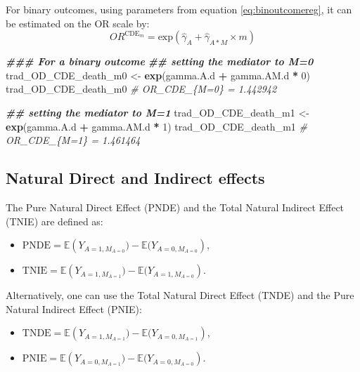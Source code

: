 \documentclass[
]{book}
\newenvironment{Shaded}{\begin{snugshade}}{\end{snugshade}}
\newcommand{\CommentTok}[1]{\textcolor[rgb]{0.56,0.35,0.01}{\textit{#1}}}
\newcommand{\DecValTok}[1]{\textcolor[rgb]{0.00,0.00,0.81}{#1}}
\newcommand{\DocumentationTok}[1]{\textcolor[rgb]{0.56,0.35,0.01}{\textbf{\textit{#1}}}}
\newcommand{\FunctionTok}[1]{\textcolor[rgb]{0.13,0.29,0.53}{\textbf{#1}}}
\newcommand{\NormalTok}[1]{#1}
\newcommand{\OtherTok}[1]{\textcolor[rgb]{0.56,0.35,0.01}{#1}}
\newcommand{\SpecialCharTok}[1]{\textcolor[rgb]{0.81,0.36,0.00}{\textbf{#1}}}
\providecommand{\tightlist}{%
  \setlength{\itemsep}{0pt}\setlength{\parskip}{0pt}}
\begin{document}
For binary outcomes, using parameters from equation \eqref{eq:binoutcomereg}, it can be estimated on the OR scale by:
\[OR^{\text{CDE}_m} = \text{exp}\left(\hat{\gamma}_A + \hat{\gamma}_{A \ast M} \times m\right)\]

\begin{Shaded}
\begin{Highlighting}[]
\DocumentationTok{\#\#\# For a binary outcome}
\DocumentationTok{\#\# setting the mediator to M=0}
\NormalTok{trad\_OD\_CDE\_death\_m0 }\OtherTok{\textless{}{-}} \FunctionTok{exp}\NormalTok{(gamma.A.d }\SpecialCharTok{+}\NormalTok{ gamma.AM.d }\SpecialCharTok{*} \DecValTok{0}\NormalTok{)}
\NormalTok{trad\_OD\_CDE\_death\_m0}
\CommentTok{\# OR\_CDE\_\{M=0\} = 1.442942 }

\DocumentationTok{\#\# setting the mediator to M=1}
\NormalTok{trad\_OD\_CDE\_death\_m1 }\OtherTok{\textless{}{-}} \FunctionTok{exp}\NormalTok{(gamma.A.d }\SpecialCharTok{+}\NormalTok{ gamma.AM.d }\SpecialCharTok{*} \DecValTok{1}\NormalTok{)}
\NormalTok{trad\_OD\_CDE\_death\_m1}
\CommentTok{\# OR\_CDE\_\{M=1\} = 1.461464 }
\end{Highlighting}
\end{Shaded}

\hypertarget{trad2waynatural}{%
\subsection{Natural Direct and Indirect effects}\label{trad2waynatural}}

The Pure Natural Direct Effect (PNDE) and the Total Natural Indirect Effect (TNIE) are defined as:

\begin{itemize}
\tightlist
\item
  \(\text{PNDE} = \mathbb{E}\left(Y_{A=1,M_{A=0}}) - \mathbb{E}(Y_{A=0,M_{A=0}}\right)\),
\item
  \(\text{TNIE} = \mathbb{E}\left(Y_{A=1,M_{A=1}}) - \mathbb{E}(Y_{A=1,M_{A=0}}\right)\).
\end{itemize}

Alternatively, one can use the Total Natural Direct Effect (TNDE) and the Pure Natural Indirect Effect (PNIE):

\begin{itemize}
\tightlist
\item
  \(\text{TNDE} = \mathbb{E}\left(Y_{A=1,M_{A=1}}) - \mathbb{E}(Y_{A=0,M_{A=1}}\right)\),
\item
  \(\text{PNIE} = \mathbb{E}\left(Y_{A=0,M_{A=1}}) - \mathbb{E}(Y_{A=0,M_{A=0}}\right)\).
\end{itemize}
\end{document}
